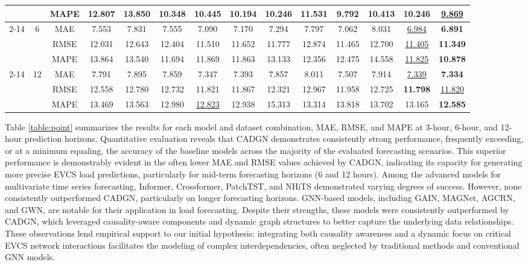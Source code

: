 \documentclass[lettersize,journal]{IEEEtran}
\begin{document}
\begin{table*}[htbp]
{\begin{tabular}{cccccccccccccc}
			&       & MAPE & 12.807  & 13.850  & 10.348  & 10.445  & 10.194  & 10.246  & 11.531  & \textbf{9.792 } & 10.413  & 10.246  & \cellcolor{tablegray}\underline{9.869 } \\
			\cmidrule{2-14}          & \multirow{3}[2]{*}{6} & MAE   & 7.553  & 7.831  & 7.555  & 7.090  & 7.170  & 7.294  & 7.797  & 7.062  & 8.031  & \underline{6.984 } & \cellcolor{tablegray}\textbf{6.891 } \\
			&       & RMSE  & 12.031  & 12.643  & 12.404  & 11.510  & 11.652  & 11.777  & 12.874  & 11.465  & 12.700  & \underline{11.405 } & \cellcolor{tablegray}\textbf{11.349 } \\
			&       & MAPE & 13.864  & 13.540  & 11.694  & 11.869  & 11.863  & 13.133  & 12.356  & 12.475  & 14.558  & \underline{11.825 } & \cellcolor{tablegray}\textbf{10.878 } \\
			\cmidrule{2-14}          & \multirow{3}[2]{*}{12} & MAE   & 7.791  & 7.895  & 7.859  & 7.347  & 7.393  & 7.857  & 8.011  & 7.507  & 7.914  & \underline{7.339 } & \cellcolor{tablegray}\textbf{7.334 } \\
			&       & RMSE  & 12.558  & 12.780  & 12.732  & 11.821  & 11.867  & 12.321  & 12.967  & 11.958  & 12.725  & \textbf{11.798 } & \cellcolor{tablegray}\underline{11.820 } \\
			&       & MAPE & 13.469  & 13.563  & 12.980  & \underline{12.823 } & 12.938  & 15.313  & 13.314  & 13.818  & 13.702  & 13.165  & \cellcolor{tablegray}\textbf{12.585 } \\
			\bottomrule
			\bottomrule
		\end{tabular}%
	}
        \vspace{-18pt}
	\label{table:point}%
\end{table*}%
Table \ref{table:point} summarizes the results for each model and dataset combination, MAE, RMSE, and MAPE at 3-hour, 6-hour, and 12-hour prediction horizons. 
Quantitative evaluation reveals that CADGN demonstrates consistently strong performance, frequently exceeding, or at a minimum equaling, the accuracy of the baseline models across the majority of the evaluated forecasting scenarios. This superior performance is demonstrably evident in the often lower MAE and RMSE values achieved by CADGN, indicating its capacity for generating more precise EVCS load predictions, particularly for mid-term forecasting horizons (6 and 12 hours). 
Among the advanced models for multivariate time series forecasting, Informer, Crossformer, PatchTST, and NHiTS demonstrated varying degrees of success. However, none consistently outperformed CADGN, particularly on longer forecasting horizons. GNN-based models, including GAIN, MAGNet, AGCRN, and GWN, are notable for their application in load forecasting. Despite their strengths, these models were consistently outperformed by CADGN, which leveraged causality-aware components and dynamic graph structures to better capture the underlying data relationships.
These observations lend empirical support to our initial hypothesis: integrating both causality awareness and a dynamic focus on critical EVCS network interactions facilitates the modeling of complex interdependencies, often neglected by traditional methods and conventional GNN models. 
\end{document}
